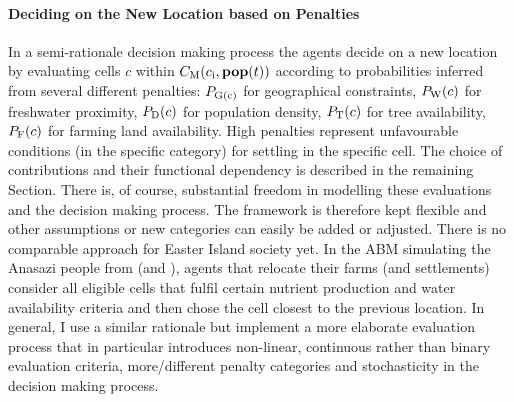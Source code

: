 \paragraph{Deciding on the New Location based on Penalties}
In a semi-rationale decision making process the agents decide on a new location by evaluating cells $c$ within $C_{\rm M} (c_{\rm i}, \mathbf{pop}(t))$ according to probabilities inferred from several different penalties:
$P_{\rm G(c)}$ for geographical constraints, $P_{\rm W}(c)$ for freshwater proximity, $P_{\rm D}(c)$ for population density, $P_{\rm T}(c)$ for tree availability, $P_{\rm F}(c)$ for farming land availability.
High penalties represent unfavourable conditions (in the specific category) for settling in the specific cell.
The choice of contributions and their functional dependency is described in the remaining Section.
There is, of course, substantial freedom in modelling these evaluations and the decision making process.
The framework is therefore kept flexible and other assumptions or new categories can easily be added or adjusted.
There is no comparable approach for Easter Island society yet.
In the ABM simulating the Anasazi people from \citet{Axtell2002} (and \citet{Janssen2009}), agents that relocate their farms (and settlements) consider all eligible cells that fulfil certain nutrient production and water availability criteria and then chose the cell closest to the previous location.
In general, I use a similar rationale but implement a more elaborate evaluation process that in particular introduces non-linear, continuous rather than binary evaluation criteria, more/different penalty categories and stochasticity in the decision making process.  

